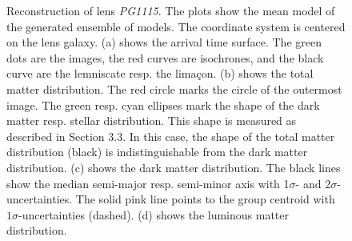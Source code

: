 \documentclass[useAMS,usenatbib]{mn2e}
\begin{document}
\begin{figure}
\begin{center}
  \caption{Reconstruction of lens \textit{PG1115}. The plots show the mean model of the generated ensemble of models. The coordinate system is centered on the lens galaxy. (a) shows the arrival time surface. The green dots are the images, the red curves are isochrones, and the black curve are the lemniscate resp. the lima\c{c}on. (b) shows the total matter distribution. The red circle marks the circle of the outermost image. The green resp. cyan ellipses mark the shape of the dark matter resp. stellar distribution. This shape is measured as described in Section 3.3. In this case, the shape of the total matter distribution (black) is indistinguishable from the dark matter distribution. (c) shows the dark matter distribution. The black lines show the median semi-major resp. semi-minor axis with 1$\sigma$- and 2$\sigma$- uncertainties. The solid pink line points to the group centroid with $1\sigma$-uncertainties (dashed). (d) shows the luminous matter distribution.}
  \label{fig:1115rec}
 \end{center}
\end{figure}

\end{document}
